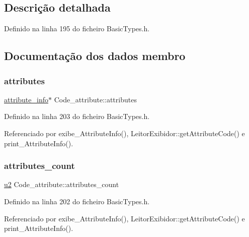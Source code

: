 \subsection{Descrição detalhada}


Definido na linha 195 do ficheiro Basic\+Types.\+h.



\subsection{Documentação dos dados membro}
\mbox{\label{structCode__attribute_abb5d2d93e2f165dd908c3788a323d093}} 
\subsubsection{\texorpdfstring{attributes}{attributes}}
{\footnotesize\ttfamily \hyperlink{structattribute__info}{attribute\+\_\+info}$\ast$ Code\+\_\+attribute\+::attributes}



Definido na linha 203 do ficheiro Basic\+Types.\+h.



Referenciado por exibe\+\_\+\+Attribute\+Info(), Leitor\+Exibidor\+::get\+Attribute\+Code() e print\+\_\+\+Attribute\+Info().

\mbox{\label{structCode__attribute_a9ca1435aa65ae02d764ff53a36fb842f}} 
\subsubsection{\texorpdfstring{attributes\+\_\+count}{attributes\_count}}
{\footnotesize\ttfamily \hyperlink{BasicTypes_8h_a732cde1300aafb73b0ea6c2558a7a54f}{u2} Code\+\_\+attribute\+::attributes\+\_\+count}



Definido na linha 202 do ficheiro Basic\+Types.\+h.



Referenciado por exibe\+\_\+\+Attribute\+Info(), Leitor\+Exibidor\+::get\+Attribute\+Code() e print\+\_\+\+Attribute\+Info().

